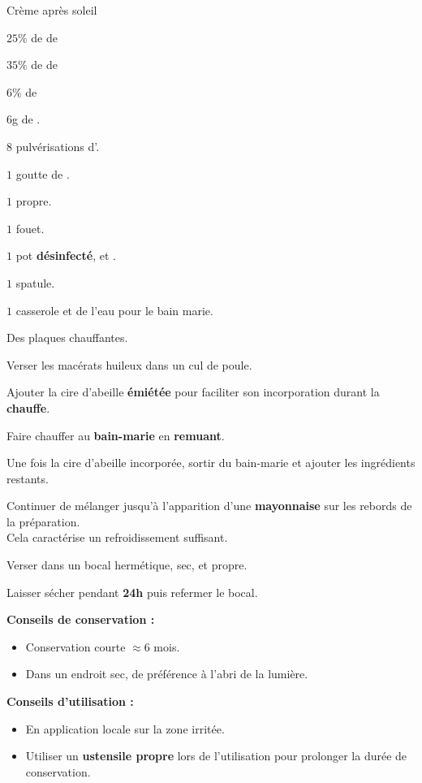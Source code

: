 \label{soleilcp}
\ficherecette
{%
    Crème après soleil
}
{%
    \item $25\%$ de  de 
    \item $35\%$ de  de 
    \item $6\%$ de 
    \item $6$g de .
    \item $8$ pulvérisations d'.
    \item $1$ goutte de .
}
{%
    \item $1$  propre. 
    \item $1$ fouet. 
    \item $1$ pot \textbf{désinfecté},  et .
    \item $1$ spatule. 
    \item $1$ casserole et de l'eau pour le bain marie. 
    \item Des plaques chauffantes. 
}
{%
\item Verser les macérats huileux dans un cul de poule. 
\item Ajouter la cire d'abeille \textbf{émiétée} pour faciliter son incorporation durant la \textbf{chauffe}.
\item Faire chauffer au \textbf{bain-marie} en \textbf{remuant}.
\item Une fois la cire d'abeille incorporée, sortir du bain-marie et ajouter les ingrédients restants. 
\item Continuer de mélanger jusqu'à l'apparition d'une \textbf{mayonnaise} sur les rebords de la préparation. \\
        Cela caractérise un refroidissement suffisant.
\item Verser dans un bocal hermétique, sec, et propre. 
\item Laisser sécher pendant \textbf{24h} puis refermer le bocal. 

}
{%
    \textbf{Conseils de conservation :}

    \begin{itemize}[label=\faPen]
        \item Conservation courte $\approx 6$ mois.
        \item Dans un endroit sec, de préférence à l'abri de la lumière. 
    \end{itemize}
    \textbf{Conseils d'utilisation :}

    \begin{itemize}[label=\faPen]
        \item En application locale sur la zone irritée.
        \item Utiliser un \textbf{ustensile propre} lors de l'utilisation pour prolonger la durée de conservation. 
    \end{itemize}
}
